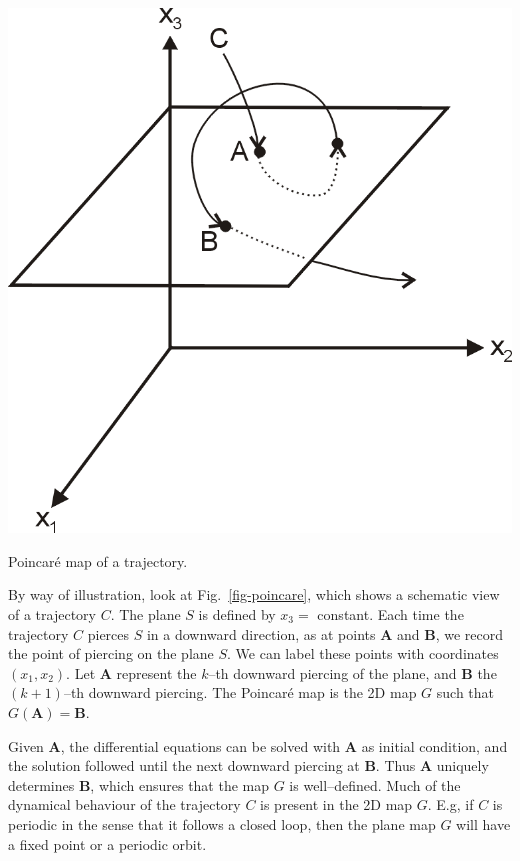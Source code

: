 \begin{marginfigure}
\centering
\includegraphics{dynamic/figures/poincare}
\caption{Poincar\'{e} map of a trajectory.}
\label{fig-poincare}
\end{marginfigure}

By way of illustration, look at Fig.~\ref{fig-poincare}, which shows a schematic view of a trajectory $C$. The plane $S$ is defined by $x_3=$ constant. Each time the trajectory $C$ pierces $S$ in a downward direction, as at points ${\mathbf A}$ and ${\mathbf B}$, we record the point of piercing on the plane $S$. We can label these points with coordinates $(x_1,x_2)$. Let ${\mathbf A}$ represent the $k$--th downward piercing of the plane, and ${\mathbf B}$ the $(k+1)$--th downward piercing. The Poincar\'{e} map is the 2D map $G$ such that $G({\mathbf A}) = {\mathbf B}$.

Given ${\mathbf A}$, the differential equations can be solved with ${\mathbf A}$ as initial condition, and the solution followed until the next downward piercing at ${\mathbf B}$. Thus ${\mathbf A}$ uniquely determines ${\mathbf B}$, which ensures that the map $G$ is well--defined. Much of the dynamical behaviour of the trajectory $C$ is present in the 2D map $G$. E.g, if $C$ is periodic in the sense that it follows a closed loop, then the plane map $G$ will have a fixed point or a periodic orbit.


